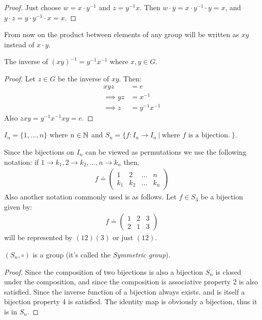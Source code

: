 \begin{proof}
  Just choose $w = x\cdot y^{-1}$ and $z = y^{-1} x$. Then $w\cdot y = x \cdot y^{-1} \cdot y = x$, and $y\cdot z = y \cdot y^{-1} \cdot x = x$.
\end{proof}
\begin{notation}
  From now on the product between elements of any group will be written as $xy$ instead of $x\cdot y$. 
\end{notation}
\begin{proposition}
  The inverse of $(xy)^{-1} = y^{-1} x^{-1}$ where $x,y\in G$.
\end{proposition}
\begin{proof}
  Let $z\in G$ be the inverse of $xy$. Then:
  \begin{align*}
    xyz &= e\\
    \implies yz &= x^{-1}\\
    \implies z &= y^{-1} x^{-1}
  \end{align*}
  Also $zxy = y^{-1} x^{-1} xy = e$.
\end{proof}
\begin{definition}
  $I_n = \{1,...,n\}$ where $n\in \mathbb{N}$ and  $S_n = \{f:I_n \to I_n\ |\ \text{where $f$ is a bijection.}\ \}$.
\end{definition}
\begin{notation}
  Since the bijections on $I_n$ can be viewed as permutations we use the following notation: if $1 \to k_1, 2\to k_2,..., n \to k_n$ then,
  \begin{align*}
    f \doteq \begin{pmatrix}
      1 & 2 & ... & n\\
      k_1 & k_2 & ... & k_n
    \end{pmatrix}
  \end{align*}
  Also another notation commonly used is as follows. Let $f\in S_3$ be a bijection given by:
  \begin{align*}
    f \doteq \begin{pmatrix}
      1 & 2 & 3\\
      2 & 1 & 3
    \end{pmatrix}
  \end{align*}
  will be represented by $(12)(3)$ or just $(12)$.
\end{notation}
\begin{proposition}
  $(S_n, \circ)$ is a group (it's called the \textit{Symmetric group}).
\end{proposition}
\begin{proof}
  Since the composition of two bijections is also a bijection $S_n$ is closed under the composition, and since the composition is associative property 2 is also satisfied. Since the inverse function of a bijection always exists. and is itself a bijection property 4 is satisfied. The identity map is obviously a bijection, thus it is in $S_n$.
\end{proof}
